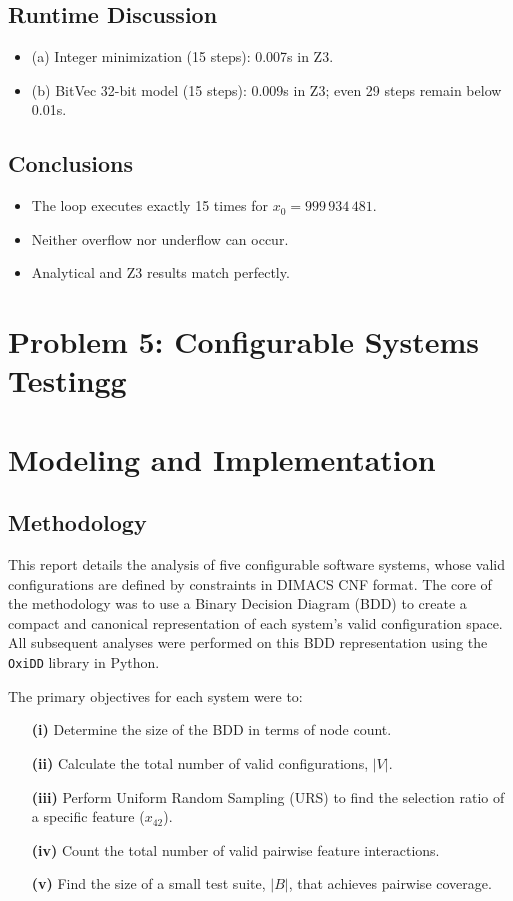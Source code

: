 \documentclass{article}
\begin{document}
\subsection*{Runtime Discussion}
\begin{itemize}
  \item (a) Integer minimization (15 steps): 0.007s in Z3.
  \item (b) BitVec 32-bit model (15 steps): 0.009s in Z3; even 29 steps remain below 0.01s.
\end{itemize}



\subsection*{Conclusions}
\begin{itemize}
\item The loop executes exactly 15 times for $x_0 = 999\,934\,481$.
\item Neither overflow nor underflow can occur.
\item Analytical and Z3 results match perfectly.
\end{itemize}



\section*{Problem 5: Configurable Systems Testingg}
\setcounter{section}{0}
\section{Modeling and Implementation}

\subsection{Methodology}
This report details the analysis of five configurable software systems, whose valid configurations are defined by constraints in DIMACS CNF format. The core of the methodology was to use a Binary Decision Diagram (BDD) to create a compact and canonical representation of each system's valid configuration space. All subsequent analyses were performed on this BDD representation using the \texttt{OxiDD} library in Python.

The primary objectives for each system were to:
\begin{itemize}
    \item[\textbf{(i)}]   Determine the size of the BDD in terms of node count.
    \item[\textbf{(ii)}]  Calculate the total number of valid configurations, $|V|$.
    \item[\textbf{(iii)}] Perform Uniform Random Sampling (URS) to find the selection ratio of a specific feature ($x_{42}$).
    \item[\textbf{(iv)}]  Count the total number of valid pairwise feature interactions.
    \item[\textbf{(v)}]   Find the size of a small test suite, $|B|$, that achieves pairwise coverage.
\end{itemize}
\end{document}
